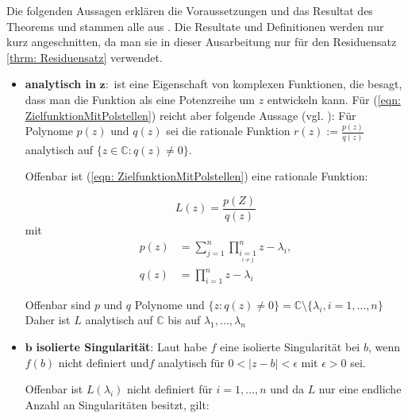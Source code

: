 \documentclass[a4paper,12pt]{report}
\newcommand{\C}{\mathbb C}
\newcommand{\1}{\mathds{1}}
\theoremstyle{plain} %
\theoremstyle{definition} %
\theoremstyle{remark}
\begin{document}
            Die folgenden Aussagen erklären die Voraussetzungen und das Resultat des Theorems und stammen alle aus \cite{complexAnalysis}.
            Die Resultate und Definitionen werden nur kurz angeschnitten, da man sie in dieser Ausarbeitung nur für den Residuensatz \ref{thrm: Residuensatz} verwendet.
            \begin{itemize}
                  \item \textbf{analytisch in }$\mathbf{z:}$ ist eine Eigenschaft von komplexen Funktionen, die besagt, dass man die Funktion als eine Potenzreihe um $z$ entwickeln kann.
                        Für (\ref{eqn: ZielfunktionMitPolstellen}) reicht aber folgende Aussage (vgl. \cite[S. 24]{complexAnalysis}):
                        Für Polynome $p(z)$ und $q(z)$ sei die rationale Funktion $r(z):=\frac{p(z)}{q(z)}$ analytisch auf $\{z\in\C: q(z)\ne 0\}$.
                        
                        Offenbar ist (\ref{eqn: ZielfunktionMitPolstellen}) eine rationale Funktion:

                        $$L(z) = \frac{p(Z)}{q(z)}$$
                        mit 
                        \begin{align*}
                              p(z) &= \sum_{j=1}^{n}\prod_{\underset{i\ne j}{i=1}}^{n} z-\lambda_i,\\
                              q(z) &= \prod_{i=1}^{n} z-\lambda_i
                        \end{align*}

                        Offenbar sind $p$ und $q$ Polynome und $\{z: q(z)\ne 0\} = \C\setminus\{\lambda_i, i=1,\dots,n\}$
                        Daher ist $L$ analytisch auf $\C$ bis auf $\lambda_1,\dots,\lambda_n$
                  \item $\mathbf{b}$\textbf{ isolierte Singularität}:
                        Laut \cite[S. 74]{complexAnalysis} habe $f$ eine isolierte Singularität bei $b$, wenn $f(b)$ nicht definiert und$f$ analytisch für $0<|z-b|<\epsilon$ mit $\epsilon>0$ sei.

                        Offenbar ist $L(\lambda_i)$ nicht definiert für $i=1,\dots,n$ und da $L$ nur eine endliche Anzahl an Singularitäten besitzt, gilt:


\end{itemize}
\end{document}
